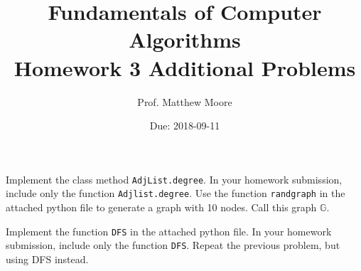 \documentclass{exam} %
\newcommand{\m}[1]{\mathbb{#1}}    %
\theoremstyle{plain}
\theoremstyle{definition}
\theoremstyle{remark}
\numberwithin{equation}{section}  %
\begin{document}
\title{Fundamentals of Computer Algorithms \\ Homework 3 Additional Problems}
\author{Prof. Matthew Moore}
\date{Due: 2018-09-11}
\maketitle
\begin{questions}
\question Implement the class method \verb|AdjList.degree|. In your homework
submission, include only the function \verb|Adjlist.degree|.
\question Use the function \texttt{randgraph} in the attached python file to
generate a graph with 10 nodes. Call this graph $\m{G}$.
\question Implement the function \verb|DFS| in the attached python file. In
your homework submission, include only the function \verb|DFS|. Repeat the
previous problem, but using DFS instead.
\end{questions} 
\end{document}
